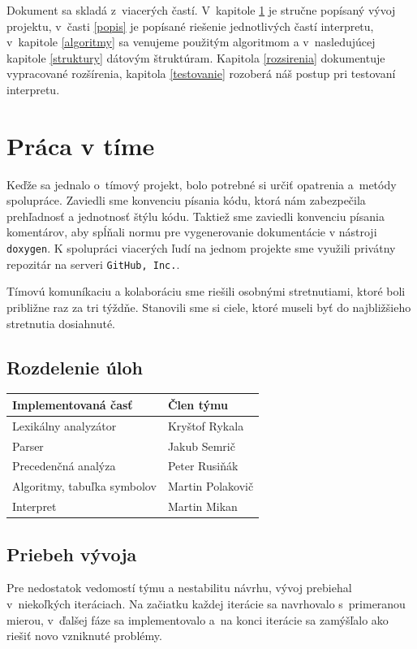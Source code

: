 \documentclass[11pt,a4paper]{article}
\begin{document}
	Dokument sa skladá z~viacerých častí. V~kapitole \ref{tim} je stručne popísaný vývoj projektu, v~časti \ref{popis} je popísané riešenie jednotlivých častí interpretu, v~kapitole \ref{algoritmy} sa venujeme použitým algoritmom a v~nasledujúcej kapitole \ref{struktury} dátovým štruktúram. Kapitola \ref{rozsirenia} dokumentuje vypracované rozšírenia, kapitola \ref{testovanie} rozoberá náš postup pri testovaní interpretu.


	\section{Práca v tíme}
	\label{tim}

	Keďže sa jednalo o~tímový projekt, bolo potrebné si určiť opatrenia a~metódy spolupráce.
    Zaviedli sme konvenciu písania kódu, ktorá nám zabezpečila prehľadnosť a jednotnosť štýlu kódu.
    Taktiež sme zaviedli konvenciu písania komentárov, aby spĺňali normu pre vygenerovanie dokumentácie v nástroji \texttt{doxygen}.
    K spolupráci viacerých ľudí na jednom projekte sme využili privátny repozitár na serveri \texttt{GitHub, Inc.}.

	Tímovú komuníkaciu a kolaboráciu sme riešili osobnými stretnutiami, ktoré boli približne raz za tri týždňe.
    Stanovili sme si ciele, ktoré museli byť do najbližšieho stretnutia dosiahnuté.

	\subsection{Rozdelenie úloh}
	\begin{center}
		\begin{tabular}{|l|l|}
			\hline
			\large{\textbf{Implementovaná časť}} & \large{\textbf{Člen týmu}}\\
			\hline
			\hline
			Lexikálny analyzátor & Kryštof Rykala \\
			\hline
			Parser & Jakub Semrič \\
			\hline
			Precedenčná analýza & Peter Rusiňák \\
			\hline
			Algoritmy, tabuľka symbolov & Martin Polakovič \\
			\hline
			Interpret & Martin Mikan \\
			\hline
		\end{tabular}
	\end{center}

	\subsection{Priebeh vývoja}
	\label{vyvoj}
	Pre nedostatok vedomostí týmu a nestabilitu návrhu, vývoj prebiehal v~niekoľkých
	iteráciach. Na začiatku každej iterácie sa navrhovalo s~primeranou mierou,
	v~ďalšej fáze sa implementovalo a~na konci iterácie sa zamýšľalo ako riešiť
	novo vzniknuté problémy.
\end{document}
